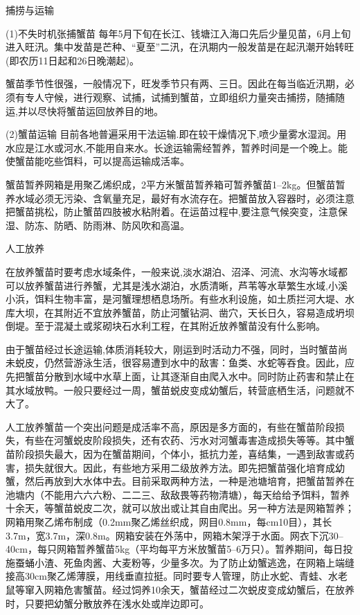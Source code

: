 \documentclass{ctexbook}
\begin{document}
捕捞与运输

(1)不失时机张捕蟹苗 每年5月下旬在长江、钱塘江入海口先后少量见苗，6月上旬进入旺汛。集中发苗是芒种、“夏至”二汛，在汛期内一般发苗是在起汛潮开始转旺(即农历11日起和26日晚潮起)。

蟹苗季节性很强，一般情况下，旺发季节只有两、三日。因此在每当临近汛期，必须有专人守候，进行观察、试捕，试捕到蟹苗，立即组织力量突击捕捞，随捕随运,并以尽快将蟹苗运回放养目的地。

(2)蟹苗运输 目前各地普遍采用干法运输.即在较干燥情况下,喷少量雾水湿润。用水应是江水或河水,不能用自来水。长途运输需经暂养，暂养时间是一个晚上。能使蟹苗能吃些饵料，可以提高运输成活率。

蟹苗暂养网箱是用聚乙烯织成，2平方米蟹苗暂养箱可暂养蟹苗1--2kg。但蟹苗暂养水域必须无污染、含氧量充足，最好有水流存在。把蟹苗放入容器时，必须注意把蟹苗挑松，防止蟹苗四肢被水粘附着。在运苗过程中,要注意气候突变，注意保湿、防冻、防晒、防雨淋、防风吹和高温。

人工放养

在放养蟹苗时要考虑水域条件，一般来说,淡水湖泊、沼泽、河流、水沟等水域都可以放养蟹苗进行养蟹，尤其是浅水湖泊，水质清晰，芦苇等水草繁生水域,小溪小浜，饵料生物丰富，是河蟹理想栖息场所。有些水利设施，如土质拦河大堤、水库大坝，在其附近不宜放养蟹苗，防止河蟹钻洞、凿穴，天长日久，容易造成坍坝倒堤。至于混凝土或浆砌块石水利工程，在其附近放养蟹苗没有什么影响。

由于蟹苗经过长途运输,体质消耗较大，刚运到时活动力不强，同时，当时蟹苗尚未蜕皮，仍然营游泳生活，很容易遭到水中的敌害：鱼类、水蛇等吞食。因此，应先把蟹苗分散到水域中水草上面，让其逐渐自由爬入水中。同时防止药害和禁止在其水域放鸭。一般只要经过一周，蟹苗蜕皮变成幼蟹后，转营底栖生活，问题就不大了。

人工放养蟹苗一个突出问题是成活率不高，原因是多方面的，有些在蟹苗阶段损失，有些在河蟹蜕皮阶段损失，还有农药、污水对河蟹毒害造成损失等等。其中蟹苗阶段损失最大，因为在蟹苗期间，个体小，抵抗力差，喜结集，一遇到敌害或药害，损失就很大。因此，有些地方采用二级放养方法。即先把蟹苗强化培育成幼蟹，然后再放到大水体中去。目前采取两种方法，一种是池塘培育，把蟹苗暂养在池塘内（不能用六六六粉、二二三、敌敌畏等药物清塘），每天给给予饵料，暂养十余天，等蟹苗蜕皮二次，就可以放出或让其自由爬出。另一种方法是网箱暂养；网箱用聚乙烯布制成（0.2mm聚乙烯丝织成，网目0.8mm，每cm10目），其长3.7m，宽3.7m，深0.8m。网箱安装在外荡中，网箱木架浮于水面。网衣下沉30--40cm，每只网箱暂养蟹苗5kg（平均每平方米放蟹苗5--6万只）。暂养期间，每日投施蚕蛹小渣、死鱼肉酱、大麦粉等，少量多次。为了防止幼蟹逃逸，在网箱上端缝接高30cm聚乙烯薄膜，用线垂直拉挺。同时要专人管理，防止水蛇、青蛙、水老鼠等窜入网箱危害蟹苗。经过饲养10余天，蟹苗经过二次蜕皮变成幼蟹后，在放养时，只要把幼蟹分散放养在浅水处或岸边即可。
\end{document}
